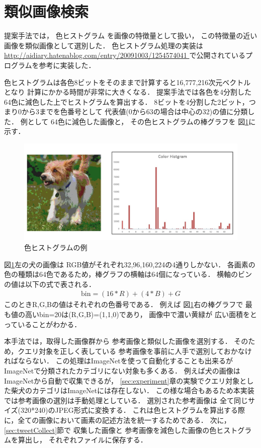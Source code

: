 \section{類似画像検索}

提案手法では，
色ヒストグラム
を画像の特徴量として扱い，
この特徴量の近い画像を類似画像として選別した．
色ヒストグラム処理の実装は
\url{
http://aidiary.hatenablog.com/entry/20091003/1254574041
}
で公開されているプログラムを参考に実装した．

色ヒストグラムは各色8ビットをそのままで計算すると16,777,216次元ベクトルとなり
計算にかかる時間が非常に大きくなる．
提案手法では各色を4分割した64色に減色した上でヒストグラムを算出する．
8ビットを4分割した2ビット，つまり0から3までを色番号として
代表値(0から63の場合は中心の32)の値に分類した．
例として
64色に減色した画像と，
その色ヒストグラムの棒グラフを
図\ref{fig:color}に示す．
%
\begin{figure}[tb]
 \begin{center}
  \includegraphics[scale=0.50]{colorhist.jpg}
 \end{center}
 \caption{色ヒストグラムの例}
 \label{fig:color}
\end{figure}
%
%
図\ref{fig:color}左の犬の画像は
RGB値がそれぞれ32,96,160,224の4通りしかない．
各画素の色の種類は64色であるため，棒グラフの横軸は64個になっている．
横軸のビンの値は以下の式で表される．
\begin{eqnarray}
\mbox{bin} = (16 * R) + (4 * B) + G
\end{eqnarray}
このときR,G,Bの値はそれぞれの色番号である．
例えば
図\ref{fig:color}右の棒グラフで
最も値の高いbin=20は(R,G,B)=(1,1,0)であり，
画像中で濃い黄緑が
広い面積をとっていることがわかる．

本手法では，取得した画像群から
参考画像と類似した画像を選別する．
そのため，クエリ対象を正しく表している
参考画像を事前に人手で選別しておかなければならない．
この処理はImageNetを使って自動化することも出来るが
ImageNetで分類されたカテゴリにない対象も多くある．
例えば犬の画像はImageNetから自動で収集できるが，
\ref{sec:experiment}章の実験でクエリ対象とした柴犬のカテゴリはImageNetには存在しない．
この様な場合もあるため本実装では参考画像の選別は手動処理としている．
%
選別された参考画像は
全て同じサイズ(320*240)のJPEG形式に変換する．
これは色ヒストグラムを算出する際に，全ての画像において画素の記述方法を統一するためである．
次に，\ref{sec:tweetCollect}節で
収集した画像と
参考画像を減色した画像の色ヒストグラムを算出し，
それぞれファイルに保存する．

